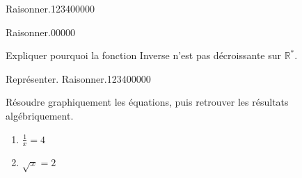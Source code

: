 \begin{pageAD}
\begin{ExoCad}{Raisonner.}{1234}{0}{0}{0}{0}{0}
\begin{description}[leftmargin=*]


\end{description}

\end{ExoCad} 


\begin{ExoCadN}{Raisonner.}{0}{0}{0}{0}{0}

Expliquer pourquoi la fonction Inverse n'est pas décroissante sur $\mathbb{R}^\ast$.



\end{ExoCadN}
 

 

 

\begin{ExoCad}{Représenter. Raisonner.}{1234}{0}{0}{0}{0}{0}

Résoudre graphiquement les équations, puis retrouver les résultats algébriquement.
\begin{enumerate}[leftmargin=*]
\item $\frac{1}{x}=4$ 

\item $\sqrt{x}=2$ 


\end{enumerate}
\end{ExoCad}
\end{pageAD}
